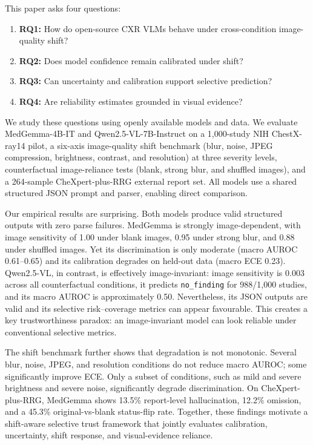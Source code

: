 This paper asks four questions:

\begin{enumerate}
\item \textbf{RQ1:} How do open-source CXR VLMs behave under cross-condition image-quality shift?
\item \textbf{RQ2:} Does model confidence remain calibrated under shift?
\item \textbf{RQ3:} Can uncertainty and calibration support selective prediction?
\item \textbf{RQ4:} Are reliability estimates grounded in visual evidence?
\end{enumerate}

We study these questions using openly available models and data. We evaluate MedGemma-4B-IT and Qwen2.5-VL-7B-Instruct on a 1,000-study NIH ChestX-ray14 pilot, a six-axis image-quality shift benchmark (blur, noise, JPEG compression, brightness, contrast, and resolution) at three severity levels, counterfactual image-reliance tests (blank, strong blur, and shuffled images), and a 264-sample CheXpert-plus-RRG external report set. All models use a shared structured JSON prompt and parser, enabling direct comparison.

Our empirical results are surprising. Both models produce valid structured outputs with zero parse failures. MedGemma is strongly image-dependent, with image sensitivity of 1.00 under blank images, 0.95 under strong blur, and 0.88 under shuffled images. Yet its discrimination is only moderate (macro AUROC 0.61--0.65) and its calibration degrades on held-out data (macro ECE 0.23). Qwen2.5-VL, in contrast, is effectively image-invariant: image sensitivity is 0.003 across all counterfactual conditions, it predicts \texttt{no\_finding} for 988/1,000 studies, and its macro AUROC is approximately 0.50. Nevertheless, its JSON outputs are valid and its selective risk--coverage metrics can appear favourable. This creates a key trustworthiness paradox: an image-invariant model can look reliable under conventional selective metrics.

The shift benchmark further shows that degradation is not monotonic. Several blur, noise, JPEG, and resolution conditions do not reduce macro AUROC; some significantly improve ECE. Only a subset of conditions, such as mild and severe brightness and severe noise, significantly degrade discrimination. On CheXpert-plus-RRG, MedGemma shows 13.5\% report-level hallucination, 12.2\% omission, and a 45.3\% original-vs-blank status-flip rate. Together, these findings motivate a shift-aware selective trust framework that jointly evaluates calibration, uncertainty, shift response, and visual-evidence reliance.

